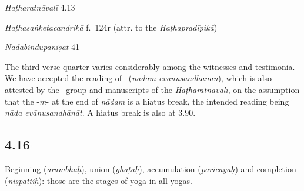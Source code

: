 \begin{ekdosis}

\begin{testimonia}[hp04_015]
\emph{Haṭharatnāvalī} 4.13
\begin{versinnote}
\end{versinnote}

\emph{Haṭhasaṅketacandrikā} f.~124r (attr. to the \emph{Haṭhapradīpikā})
\begin{versinnote}
\end{versinnote}

\emph{Nādabindūpaniṣat} 41
\begin{versinnote}
\end{versinnote}
\end{testimonia}

\begin{philcomm}[hp04_015]

The third verse quarter varies considerably among the witnesses and testimonia. We have accepted the reading of \alphaOne\ (\emph{nādam evānusandhānān}), which is also attested by the \textbeta\ group and manuscripts of the \emph{Haṭharatnāvalī}, on the assumption that the -\emph{m}- at the end of \emph{nādam} is a hiatus break, the intended reading being \textit{nāda evānusandhānāt}. A hiatus break is also at 3.90.
\end{philcomm}

\subsection*{4.16}
\begin{translation}[hp04_016]
Beginning (\emph{ārambhaḥ}), union (\emph{ghaṭaḥ}), accumulation (\emph{paricayaḥ}) and completion (\emph{niṣpattiḥ}): those are the stages of yoga in all yogas.
\end{translation}


\end{ekdosis}
